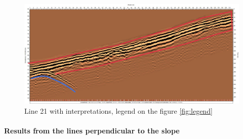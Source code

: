 \begin{figure}[p]
    \centering
    \includegraphics[width=\linewidth]{Images/00_Results/line21_edited.jpg}
    \caption{Line 21 with interpretations, legend on the figure \ref{fig:legend}}
    \label{fig:line21}
\end{figure}

\paragraph{Results from the lines perpendicular to the slope}